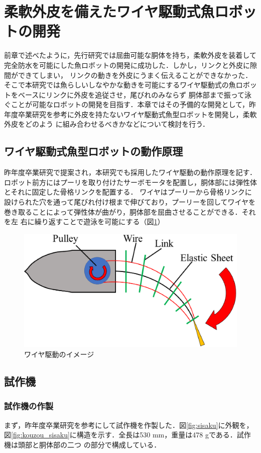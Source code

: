 \newpage
\section{柔軟外皮を備えたワイヤ駆動式魚ロボットの開発}
前章で述べたように，先行研究\cite{kyu}では屈曲可能な胴体を持ち，柔軟外皮を装着して完全防水を可能にした魚ロボットの開発に成功した．しかし，リンクと外皮に隙間ができてしまい，
リンクの動きを外皮にうまく伝えることができなかった．そこで本研究では魚らしいしなやかな動きを可能にするワイヤ駆動式の魚ロボットをベースにリンクに外皮を追従させ，尾びれのみならず
胴体部まで振って泳ぐことが可能なロボットの開発を目指す．本章ではその予備的な開発として，昨年度卒業研究を参考に外皮を持たないワイヤ駆動式魚型ロボットを開発し，柔軟外皮をどのよう
に組み合わせるべきかなどについて検討を行う．
\subsection{ワイヤ駆動式魚型ロボットの動作原理}
昨年度卒業研究で提案され，本研究でも採用したワイヤ駆動の動作原理を記す．ロボット前方にはプーリを取り付けたサーボモータを配置し，胴体部には弾性体とそれに固定した骨格リンクを配置する．
ワイヤはプーリーから骨格リンクに設けられた穴を通って尾びれ付け根まで伸びており，プーリーを回してワイヤを巻き取ることによって弾性体が曲がり，胴体部を屈曲させることができる．それを左
右に繰り返すことで遊泳を可能にする（図\ref{fig:waiyakudou}）

\begin{figure}[b]
   \centering
   \includegraphics[width=0.6\linewidth]{chapters/picture/waiyakudou.eps}
   \caption{ワイヤ駆動のイメージ}
   \label{fig:waiyakudou}
\end{figure}

\subsection{試作機}
\subsubsection{試作機の作製}
まず，昨年度卒業研究を参考にして試作機を作製した．図\ref{fig:sisaku}に外観を，図\ref{fig:kouzou_sisaku}に構造を示す．全長は530 mm，重量は478 gである．試作機は頭部と胴体部の二つ
の部分で構成している．

